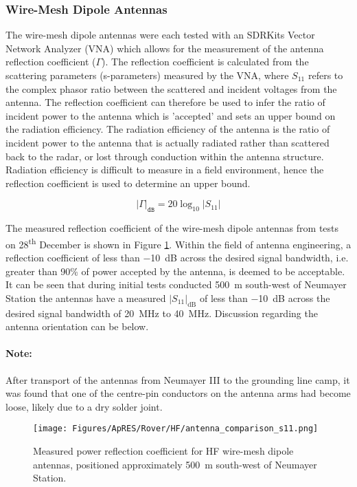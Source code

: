 \documentclass[a4paper,12pt]{article}
\begin{document}
\subsubsection*{Wire-Mesh Dipole Antennas}
The wire-mesh dipole antennas were each tested with an SDRKits Vector Network
Analyzer (VNA) which allows for the measurement of the antenna reflection
coefficient ($\Gamma$).  The reflection coefficient is calculated from the
scattering parameters (s-parameters) measured by the VNA, where $S_{11}$ 
refers to the complex phasor ratio between the scattered and incident voltages from
the antenna.  The reflection coefficient can therefore be used to infer the 
ratio of incident power to the antenna which is 'accepted' and sets an upper
bound on the radiation efficiency.  The radiation efficiency of the antenna
is the ratio of incident power to the antenna that is actually radiated
rather than scattered back to the radar, or lost through conduction within the
antenna structure.  Radiation efficiency is difficult to measure in a field 
environment, hence the reflection coefficient is used to determine an upper
bound.

\begin{equation}
  \left|\Gamma\right|_{\texttt{dB}} = 20\log_{10} \left|S_{11}\right|
\end{equation}

The measured reflection coefficient of the wire-mesh dipole antennas from tests
on 28\textsuperscript{th} December is shown in Figure
\ref{FigureWireMeshNeumayer}.  Within the field of antenna engineering, a
reflection coefficient of less than \SI{-10}{\deci\bel} across the desired
signal bandwidth, i.e. greater than 90\% of power accepted by the antenna, is
deemed to be acceptable.  It can be seen that during initial tests conducted
\SI{500}{\metre} south-west of Neumayer Station the antennas have a measured
$\left|S_{11}\right|_{\textrm{dB}}$ of less than \SI{-10}{\deci\bel} across the
desired signal bandwidth of \SI{20}{\mega\hertz} to \SI{40}{\mega\hertz}.
Discussion regarding the antenna orientation can be below.

\paragraph*{Note:} After transport of the antennas from Neumayer III to the
grounding line camp, it was found that one of the centre-pin conductors on the
antenna arms had become loose, likely due to a dry solder joint.

\begin{figure}[htbp]
  \centering
  \texttt{[image: Figures/ApRES/Rover/HF/antenna\_comparison\_s11.png]}
  \caption{
    Measured power reflection coefficient for HF wire-mesh dipole antennas, 
    positioned approximately \SI{500}{\metre} south-west of Neumayer Station.
  }
  \label{FigureWireMeshNeumayer}
\end{figure}
\end{document}
